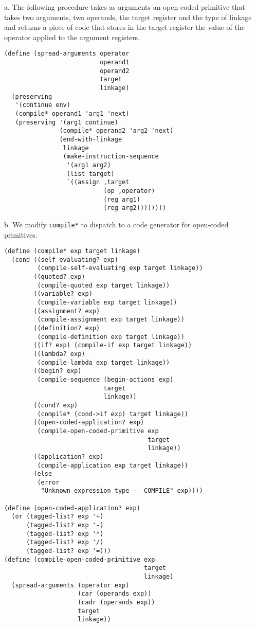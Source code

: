 \documentclass[a4paper,12pt]{article}
\newcommand{\subpar}[1]{\medskip \noindent #1.}
\begin{document}
\subpar{a} The following procedure takes as arguments an open-coded
primitive that takes two arguments, two operands, the target register
and the type of linkage and returns a piece of code that stores in the
target register the value of the operator applied to the argument
registers.

\begin{lstlisting}
(define (spread-arguments operator
                          operand1
                          operand2
                          target
                          linkage)
  (preserving
   '(continue env)
   (compile* operand1 'arg1 'next)
   (preserving '(arg1 continue)
               (compile* operand2 'arg2 'next)
               (end-with-linkage
                linkage
                (make-instruction-sequence
                 '(arg1 arg2)
                 (list target)
                 `((assign ,target
                           (op ,operator)
                           (reg arg1)
                           (reg arg2))))))))
\end{lstlisting}

\subpar{b}  We modify \lstinline!compile*! to dispatch to a code
generator for open-coded primitives.

\begin{lstlisting}
(define (compile* exp target linkage)
  (cond ((self-evaluating? exp)
         (compile-self-evaluating exp target linkage))
        ((quoted? exp)
         (compile-quoted exp target linkage))
        ((variable? exp)
         (compile-variable exp target linkage))
        ((assignment? exp)
         (compile-assignment exp target linkage))
        ((definition? exp)
         (compile-definition exp target linkage))
        ((if? exp) (compile-if exp target linkage))
        ((lambda? exp)
         (compile-lambda exp target linkage))
        ((begin? exp)
         (compile-sequence (begin-actions exp)
                           target
                           linkage))
        ((cond? exp)
         (compile* (cond->if exp) target linkage))
        ((open-coded-application? exp)
         (compile-open-coded-primitive exp
                                       target
                                       linkage))
        ((application? exp)
         (compile-application exp target linkage))
        (else
         (error
          "Unknown expression type -- COMPILE" exp))))

(define (open-coded-application? exp)
  (or (tagged-list? exp '+)
      (tagged-list? exp '-)
      (tagged-list? exp '*)
      (tagged-list? exp '/)
      (tagged-list? exp '=)))
(define (compile-open-coded-primitive exp
                                      target
                                      linkage)
  (spread-arguments (operator exp)
                    (car (operands exp))
                    (cadr (operands exp))
                    target
                    linkage))
\end{lstlisting}
\end{document}

